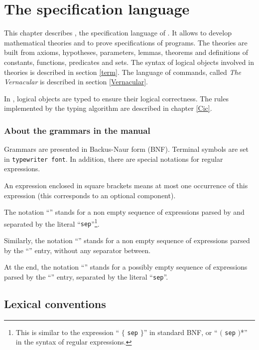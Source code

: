 \chapter{The \gallina{} specification language
\label{Gallina}}

This chapter describes \gallina, the specification language of {\Coq}.
It allows to develop mathematical theories and to prove specifications
of programs.  The theories are built from axioms, hypotheses,
parameters, lemmas, theorems and definitions of constants, functions,
predicates and sets. The syntax of logical objects involved in
theories is described in section \ref{term}. The language of
commands, called {\em The Vernacular} is described in section
\ref{Vernacular}.

In {\Coq}, logical objects are typed to ensure their logical
correctness. The rules implemented by the typing algorithm are described in
chapter \ref{Cic}.

\subsection*{About the grammars in the manual
\label{BNF-syntax}}

Grammars are presented in Backus-Naur form (BNF). Terminal symbols are
set in {\tt typewriter font}.  In addition, there are special
notations for regular expressions.

An expression enclosed in square brackets \zeroone{\ldots} means at
most one occurrence of this expression (this corresponds to an
optional component).

The notation ``'' stands for a non empty
sequence of expressions parsed by {\entry} and
separated by the literal ``{\tt sep}''\footnote{This is similar to the
expression ``{\entry} $\{$ {\tt sep} {\entry} $\}$'' in
standard BNF, or ``{\entry} $($ {\tt sep} {\entry} $)$*'' in
the syntax of regular expressions.}.

Similarly, the notation ``\nelist{\entry}{}'' stands for a non
empty sequence of expressions parsed by the ``{\entry}'' entry,
without any separator between.

At the end, the notation ``'' stands for a
possibly empty sequence of expressions parsed by the ``{\entry}'' entry,
separated by the literal ``{\tt sep}''.

\section{Lexical conventions
\label{lexical}}

